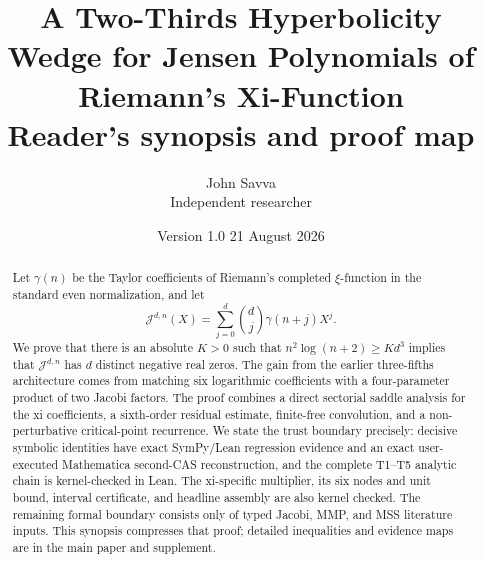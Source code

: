 \documentclass[11pt]{article}
\title{A Two-Thirds Hyperbolicity Wedge for Jensen Polynomials of
Riemann's Xi-Function\\\large Reader's synopsis and proof map}
\author{John Savva\\{\small Independent researcher}}
\date{Version 1.0 \textemdash{} 21 August 2026}
\theoremstyle{definition}
\theoremstyle{remark}
\newcommand{\J}{\mathcal J}
\begin{document}
\maketitle

\begin{center}
\end{center}

\begin{abstract}
Let $\gamma(n)$ be the Taylor coefficients of Riemann's completed
$\xi$-function in the standard even normalization, and let
\[
  \J^{d,n}(X)=\sum_{j=0}^d \binom{d}{j}\gamma(n+j)X^j.
\]
We prove that there is an absolute $K>0$ such that
$n^2\log(n+2)\ge Kd^3$ implies that $\J^{d,n}$ has $d$ distinct negative
real zeros.  The gain from the earlier three-fifths architecture comes from
matching six logarithmic coefficients with a four-parameter product of two
Jacobi factors.  The proof combines a direct sectorial saddle analysis for
the xi coefficients, a sixth-order residual estimate, finite-free
convolution, and a non-perturbative critical-point recurrence.  We state the
trust boundary precisely: decisive symbolic identities have exact
SymPy/Lean regression evidence and an exact user-executed Mathematica
second-CAS reconstruction, and the complete T1--T5 analytic chain is
kernel-checked in Lean.  The xi-specific multiplier, its six nodes and unit
bound, interval certificate, and headline assembly are also kernel checked.
The remaining formal boundary consists only of typed Jacobi, MMP, and MSS
literature inputs.
This synopsis compresses that proof; detailed inequalities and evidence maps
are in the main paper and supplement.
\end{abstract}
\end{document}
